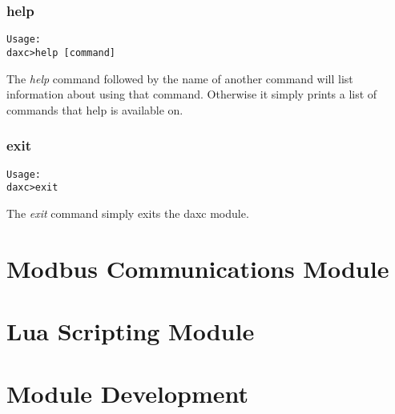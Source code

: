 \subsection{help}
\begin{verbatim}
Usage:
daxc>help [command]
\end{verbatim}

The \textit{help} command followed by the name of another command will list information about using that command. Otherwise it simply prints a list of commands that help is available on.

\subsection{exit}
\begin{verbatim}
Usage:
daxc>exit
\end{verbatim}
The \textit{exit} command simply exits the daxc module.

\chapter{Modbus Communications Module}

\chapter{Lua Scripting Module}


\chapter{Module Development}


